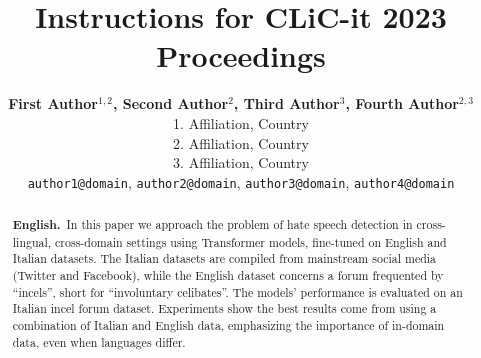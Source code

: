 \documentclass[11pt]{article}
\title{Instructions for CLiC-it 2023 Proceedings}
\author{\textbf{First Author$^{1,2}$, Second Author$^{2}$, Third Author$^{3}$, Fourth Author$^{2,3}$} \\
  1. Affiliation, Country \\
  2. Affiliation, Country \\
  3. Affiliation, Country \\
  {\tt author1@domain}, {\tt author2@domain}, {\tt author3@domain}, {\tt author4@domain}}
\date{}
\begin{document}
\maketitle
\begin{abstract}
\textbf{English.}~In this paper we approach the problem of hate speech detection in cross-lingual, cross-domain settings using Transformer models, fine-tuned on English and Italian datasets. The Italian datasets are compiled from mainstream social media (Twitter and Facebook), while the English dataset concerns a forum frequented by ``incels'', short for ``involuntary celibates''. The models' performance is evaluated on an Italian incel forum dataset. Experiments show the best results come from using a combination of Italian and English data, emphasizing the importance of in-domain data, even when languages differ.


\end{abstract}
\end{document}
